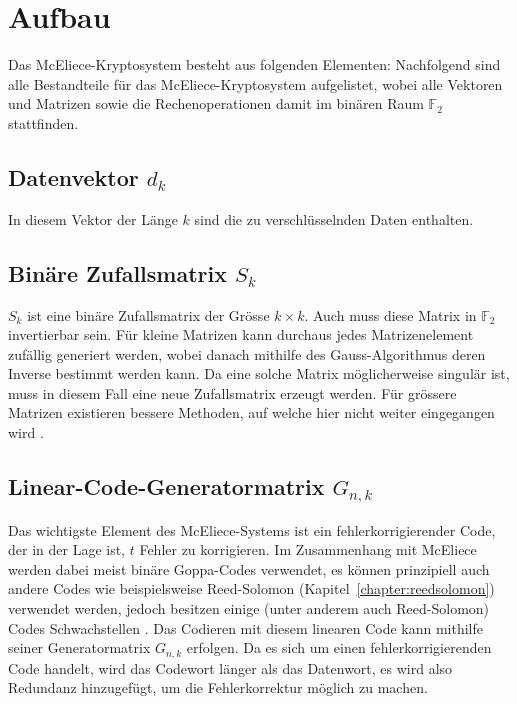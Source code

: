 %
%
%
\section{Aufbau\label{mceliece:section:Aufbau}}
Das McEliece-Kryptosystem besteht aus folgenden Elementen:
Nachfolgend sind alle Bestandteile für das McEliece-Kryptosystem aufgelistet,
wobei alle Vektoren und Matrizen sowie die Rechenoperationen damit
im binären Raum $\mathbb{F}_2$ stattfinden.
%

\subsection{Datenvektor $d_k$
\label{mceliece:subsection:d_k}}
In diesem Vektor der Länge $k$ sind die zu verschlüsselnden Daten enthalten.

\subsection{Binäre Zufallsmatrix $S_k$
\label{mceliece:subsection:s_k}}
$S_k$ ist eine binäre Zufallsmatrix der Grösse $k \times k$.
Auch muss diese Matrix in $\mathbb{F}_2$ invertierbar sein.
Für kleine Matrizen kann durchaus jedes Matrizenelement zufällig generiert werden,
wobei danach mithilfe des Gauss-Algorithmus deren Inverse bestimmt werden kann.
%
%
Da eine solche Matrix möglicherweise singulär ist, muss in diesem Fall eine neue Zufallsmatrix erzeugt werden.
%
Für grössere Matrizen existieren bessere Methoden, auf welche hier nicht weiter eingegangen wird \cite{mceliece:GenerationRandMatrix}.

\subsection{Linear-Code-Generatormatrix $G_{n,k}$
\label{mceliece:subsection:g_nk}}
%
%
Das wichtigste Element des McEliece-Systems ist ein fehlerkorrigierender Code,
der in der Lage ist, $t$ Fehler zu korrigieren.
%
Im Zusammenhang mit McEliece werden dabei meist binäre Goppa-Codes \cite{mceliece:goppa} verwendet,
%
es können prinzipiell auch andere Codes wie beispielsweise Reed-Solomon (Kapitel~\ref{chapter:reedsolomon}) verwendet werden,
%
jedoch besitzen einige (unter anderem auch Reed-Solomon) Codes Schwachstellen \cite{mceliece:lorenz}.
Das Codieren mit diesem linearen Code kann mithilfe seiner Generatormatrix $G_{n,k}$ erfolgen.
Da es sich um einen fehlerkorrigierenden Code handelt,
wird das Codewort länger als das Datenwort,
es wird also Redundanz hinzugefügt,
%
um die Fehlerkorrektur möglich zu machen.

